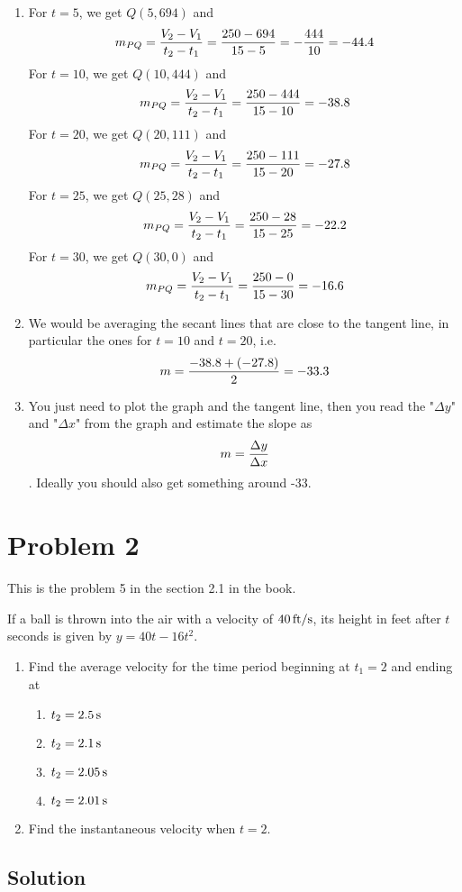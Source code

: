 \documentclass[10pt]{article}
\begin{document}
\begin{enumerate}
\item
For $t=5$, we get $Q(5, 694)$ and
$$m_{PQ}={V_2-V_1\over t_2-t_1}={250-694\over 15-5}=-{444\over10}=-44.4$$
For $t=10$, we get $Q(10, 444)$ and
$$m_{PQ}={V_2-V_1\over t_2-t_1}={250-444\over 15-10}=-38.8$$
For $t=20$, we get $Q(20, 111)$ and
$$m_{PQ}={V_2-V_1\over t_2-t_1}={250-111\over 15-20}=-27.8$$
For $t=25$, we get $Q(25, 28)$ and
$$m_{PQ}={V_2-V_1\over t_2-t_1}={250-28\over 15-25}=-22.2$$
For $t=30$, we get $Q(30, 0)$ and
$$m_{PQ}={V_2-V_1\over t_2-t_1}={250-0\over 15-30}=-16.6$$
\item We would be averaging the secant lines that are close to the tangent
line, in particular the ones for $t=10$ and $t=20$, i.e.
$$m = {-38.8+(-27.8)\over 2} =-33.3$$ 
\item You just need to plot the graph and the tangent line, then you read the
"$\Delta y$" and "$\Delta x$" from the graph and estimate the slope as
$$m={\Delta y\over\Delta x}$$. Ideally you should also get something around
-33.
\end{enumerate}

\section{Problem 2}

This is the problem 5 in the section 2.1 in the book.

If a ball is thrown into the air with a velocity of $40\rm\,ft/s$, its height
in feet after $t$ seconds is given by $y=40t-16t^2$.
\begin{enumerate}
\item Find the average velocity for the time period beginning at $t_1=2$ and
ending at
\begin{enumerate}
\item $t_2=2.5\rm\,s$
\item $t_2=2.1\rm\,s$
\item $t_2=2.05\rm\,s$
\item $t_2=2.01\rm\,s$
\end{enumerate}
\item Find the instantaneous velocity when $t=2$.
\end{enumerate}

\subsection*{Solution}
\end{document}
